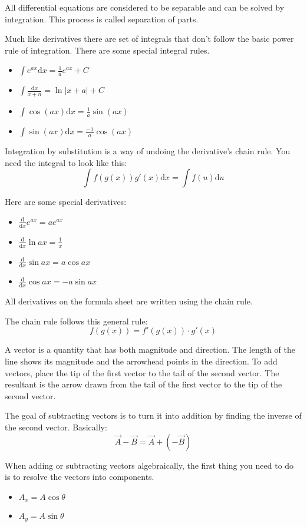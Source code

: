 \documentclass[../em.tex]{subfiles}
\begin{document}
All differential equations are considered to be separable and can be solved by integration. This process is called separation of parts.

Much like derivatives there are set of integrals that don't follow the basic power rule of integration. There are some special integral rules.
\begin{itemize}
    \item $\int{e^{ax}}\mathrm{d}x=\frac{1}{a}e^{ax}+C$
    \item $\int \frac{\mathrm{d}x}{x+n}=\ln |x+a|+C$
    \item $\int \cos(ax)\mathrm{d}x = \frac{1}{a}\sin(ax)$
    \item $\int \sin(ax)\mathrm{d}x=\frac{-1}{a}\cos(ax)$
\end{itemize}

Integration by substitution is a way of undoing the derivative's chain rule. You need the integral to look like this:
\[\int f(g(x))g'(x)\mathrm{d}x=\int f(u)\mathrm{d}u\]

Here are some special derivatives:
\begin{itemize}
    \item $\frac{\mathrm{d}}{\mathrm{d}x}e^{ax}=ae^{ax}$
    \item $\frac{\mathrm{d}}{\mathrm{d}x}\ln ax = \frac{1}{x}$
    \item $\frac{\mathrm{d}}{\mathrm{d}x}\sin ax = a\cos ax$
    \item $\frac{\mathrm{d}}{\mathrm{d}x}\cos ax = -a\sin ax$
\end{itemize}

All derivatives on the formula sheet are written using the chain rule.

The chain rule follows this general rule: 
\[f(g(x))=f'(g(x))\cdot g'(x)\]

A vector is a quantity that has both magnitude and direction. The length of the line shows its 
magnitude and the arrowhead points in the direction.
To add vectors, place the tip of the first vector to the tail of the second vector.
The resultant is the arrow drawn from the tail of the first vector to the tip of the second vector.

The goal of subtracting vectors is to turn it into addition by finding the inverse of the second vector. Basically: 
\[\vec{A}-\vec{B}=\vec{A}+(-\vec{B})\]

When adding or subtracting vectors algebraically, the first thing you need to do is to resolve the vectors into components.
\begin{itemize}
    \item $A_x = A\cos \theta$
    \item $A_y = A\sin \theta$
\end{itemize}
\end{document}
